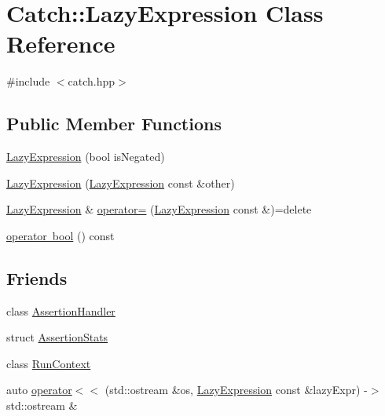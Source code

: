 \hypertarget{class_catch_1_1_lazy_expression}{}\section{Catch\+:\+:Lazy\+Expression Class Reference}
\label{class_catch_1_1_lazy_expression}


{\ttfamily \#include $<$catch.\+hpp$>$}

\subsection*{Public Member Functions}
\begin{DoxyCompactItemize}
\item 
\mbox{\hyperlink{class_catch_1_1_lazy_expression_a47186c2487bd4bf871e870ba8048553a}{Lazy\+Expression}} (bool is\+Negated)
\item 
\mbox{\hyperlink{class_catch_1_1_lazy_expression_ab82d5e94df0e159b018fbde0170e46f8}{Lazy\+Expression}} (\mbox{\hyperlink{class_catch_1_1_lazy_expression}{Lazy\+Expression}} const \&other)
\item 
\mbox{\hyperlink{class_catch_1_1_lazy_expression}{Lazy\+Expression}} \& \mbox{\hyperlink{class_catch_1_1_lazy_expression_ae4ae00d4f36f084c369f2da36565a822}{operator=}} (\mbox{\hyperlink{class_catch_1_1_lazy_expression}{Lazy\+Expression}} const \&)=delete
\item 
\mbox{\hyperlink{class_catch_1_1_lazy_expression_acdb846cb230cecfc6aca7a925b31fbca}{operator bool}} () const
\end{DoxyCompactItemize}
\subsection*{Friends}
\begin{DoxyCompactItemize}
\item 
class \mbox{\hyperlink{class_catch_1_1_lazy_expression_a4301a3aa57b612dd8b6ef8461742ecab}{Assertion\+Handler}}
\item 
struct \mbox{\hyperlink{class_catch_1_1_lazy_expression_a64019eb137f5ce447cdc71cb80b6e7a4}{Assertion\+Stats}}
\item 
class \mbox{\hyperlink{class_catch_1_1_lazy_expression_af3aa096bb29a772bc534830f29a2ce7a}{Run\+Context}}
\item 
auto \mbox{\hyperlink{class_catch_1_1_lazy_expression_aa01086581cab2fcd2d4580b8fa787dfc}{operator$<$$<$}} (std\+::ostream \&os, \mbox{\hyperlink{class_catch_1_1_lazy_expression}{Lazy\+Expression}} const \&lazy\+Expr) -\/$>$ std\+::ostream \&
\end{DoxyCompactItemize}


